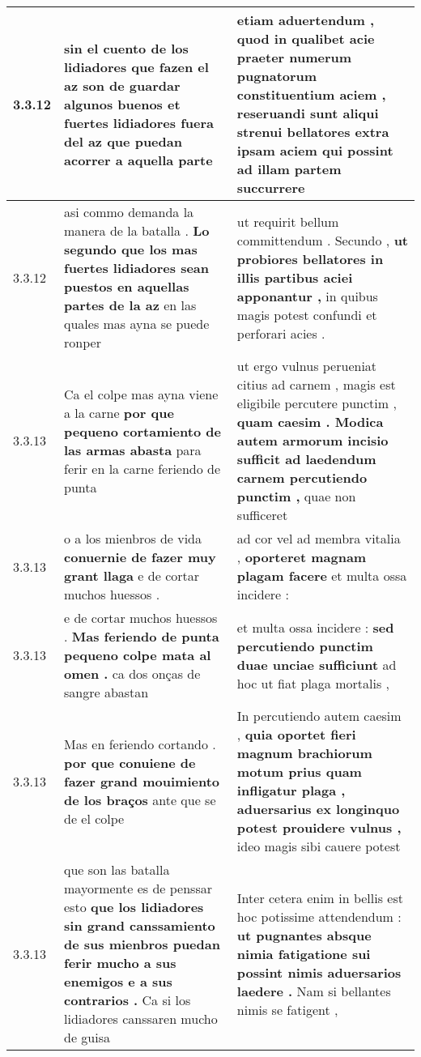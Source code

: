 \begin{tabular}{|p{1cm}|p{6.5cm}|p{6.5cm}|}
3.3.12 & sin el cuento de los lidiadores \textbf{ que fazen el az son de guardar algunos buenos et fuertes lidiadores fuera del az } que puedan acorrer a aquella parte & etiam aduertendum , \textbf{ quod in qualibet acie praeter numerum pugnatorum constituentium aciem , reseruandi sunt aliqui strenui bellatores extra ipsam aciem qui possint } ad illam partem succurrere \\\hline
3.3.12 & asi commo demanda la manera de la batalla . \textbf{ Lo segundo que los mas fuertes lidiadores sean puestos en aquellas partes de la az } en las quales mas ayna se puede ronper & ut requirit bellum committendum . Secundo , \textbf{ ut probiores bellatores in illis partibus aciei apponantur , } in quibus magis potest confundi et perforari acies . \\\hline
3.3.13 & Ca el colpe mas ayna viene a la carne \textbf{ por que pequeno cortamiento de las armas abasta } para ferir en la carne feriendo de punta & ut ergo vulnus perueniat citius ad carnem , magis est eligibile percutere punctim , \textbf{ quam caesim . Modica autem armorum incisio sufficit ad laedendum carnem percutiendo punctim , } quae non sufficeret \\\hline
3.3.13 & o a los mienbros de vida \textbf{ conuernie de fazer muy grant llaga } e de cortar muchos huessos . & ad cor vel ad membra vitalia , \textbf{ oporteret magnam plagam facere } et multa ossa incidere : \\\hline
3.3.13 & e de cortar muchos huessos . \textbf{ Mas feriendo de punta pequeno colpe mata al omen . } ca dos onças de sangre abastan & et multa ossa incidere : \textbf{ sed percutiendo punctim duae unciae sufficiunt } ad hoc ut fiat plaga mortalis , \\\hline
3.3.13 & Mas en feriendo cortando . \textbf{ por que conuiene de fazer grand mouimiento de los braços } ante que se de el colpe & In percutiendo autem caesim , \textbf{ quia oportet fieri magnum brachiorum motum prius quam infligatur plaga , aduersarius ex longinquo potest prouidere vulnus , } ideo magis sibi cauere potest \\\hline
3.3.13 & que son las batalla mayormente es de penssar esto \textbf{ que los lidiadores sin grand canssamiento de sus mienbros puedan ferir mucho a sus enemigos e a sus contrarios . } Ca si los lidiadores canssaren mucho de guisa & Inter cetera enim in bellis est hoc potissime attendendum : \textbf{ ut pugnantes absque nimia fatigatione sui possint nimis aduersarios laedere . } Nam si bellantes nimis se fatigent , \\\hline

\end{tabular}
